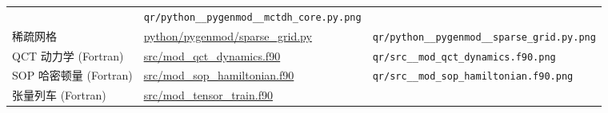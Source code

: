 \documentclass[
]{ctexbook}
\begin{document}
\begin{longtable}[]{@{}lll@{}}
\begin{minipage}[t]{0.30\columnwidth}
\end{minipage} & \begin{minipage}[t]{0.30\columnwidth}\raggedright
\texttt{qr/python\_\_pygenmod\_\_mctdh\_core.py.png}\strut
\end{minipage}\tabularnewline
\begin{minipage}[t]{0.30\columnwidth}\raggedright
稀疏网格\strut
\end{minipage} & \begin{minipage}[t]{0.30\columnwidth}\raggedright
\href{https://github.com/l1Ha/QuantumGeneralModule/blob/main/python/pygenmod/sparse_grid.py}{python/pygenmod/sparse\_grid.py}\strut
\end{minipage} & \begin{minipage}[t]{0.30\columnwidth}\raggedright
\texttt{qr/python\_\_pygenmod\_\_sparse\_grid.py.png}\strut
\end{minipage}\tabularnewline
\begin{minipage}[t]{0.30\columnwidth}\raggedright
QCT 动力学 (Fortran)\strut
\end{minipage} & \begin{minipage}[t]{0.30\columnwidth}\raggedright
\href{https://github.com/l1Ha/QuantumGeneralModule/blob/main/src/mod_qct_dynamics.f90}{src/mod\_qct\_dynamics.f90}\strut
\end{minipage} & \begin{minipage}[t]{0.30\columnwidth}\raggedright
\texttt{qr/src\_\_mod\_qct\_dynamics.f90.png}\strut
\end{minipage}\tabularnewline
\begin{minipage}[t]{0.30\columnwidth}\raggedright
SOP 哈密顿量 (Fortran)\strut
\end{minipage} & \begin{minipage}[t]{0.30\columnwidth}\raggedright
\href{https://github.com/l1Ha/QuantumGeneralModule/blob/main/src/mod_sop_hamiltonian.f90}{src/mod\_sop\_hamiltonian.f90}\strut
\end{minipage} & \begin{minipage}[t]{0.30\columnwidth}\raggedright
\texttt{qr/src\_\_mod\_sop\_hamiltonian.f90.png}\strut
\end{minipage}\tabularnewline
\begin{minipage}[t]{0.30\columnwidth}\raggedright
张量列车 (Fortran)\strut
\end{minipage} & \begin{minipage}[t]{0.30\columnwidth}\raggedright
\href{https://github.com/l1Ha/QuantumGeneralModule/blob/main/src/mod_tensor_train.f90}{src/mod\_tensor\_train.f90}\strut

\end{minipage}
\end{longtable}
\end{document}
